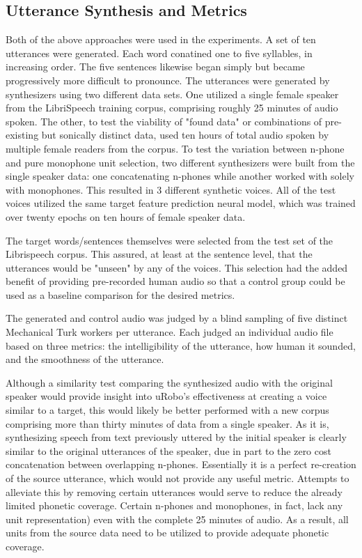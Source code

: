 \documentclass[10pt, journal, compsoc]{IEEEtran}
\begin{document}
\subsection{Utterance Synthesis and Metrics}
Both of the above approaches were used in the experiments. A set of ten utterances were generated. Each word conatined one to five syllables, in increasing order. The five sentences likewise began simply but became progressively more difficult to pronounce. The utterances were generated by synthesizers using two different data sets. One utilized a single female speaker from the LibriSpeech training corpus, comprising roughly 25 minutes of audio spoken. The other, to test the viability of "found data" or combinations of pre-existing but sonically distinct data, used ten hours of total audio spoken by multiple female readers from the corpus. To test the variation between n-phone and pure monophone unit selection, two different synthesizers were built from the single speaker data: one concatenating n-phones while another worked with solely with monophones. This resulted in 3 different synthetic voices. All of the test voices utilized the same target feature prediction neural  model, which was trained over twenty epochs on ten hours of female speaker data.\par 
The target words/sentences themselves were selected from the test set of the Librispeech corpus. This assured, at least at the sentence level, that the utterances would be "unseen" by any of the voices. This selection had the added benefit of providing pre-recorded human audio so that a control group could be used as a baseline comparison for the desired metrics. \par
The generated and control audio was judged by a blind sampling of five distinct Mechanical Turk workers per utterance. Each judged an individual audio file based on three metrics: the intelligibility of the utterance, how human it sounded, and the smoothness of the utterance.\par
Although a similarity test comparing the synthesized audio with the original speaker would provide insight into uRobo's effectiveness at creating a voice similar to a target, this would likely be better performed with a new corpus comprising more than thirty minutes of data from a single speaker. As it is, synthesizing speech from text previously uttered by the initial speaker is clearly similar to the original utterances of the speaker, due in part to the zero cost concatenation between overlapping n-phones. Essentially it is a perfect re-creation of the source utterance, which would not provide any useful metric. Attempts to alleviate this by removing certain utterances would serve to reduce the already limited phonetic coverage. Certain n-phones and monophones, in fact, lack any unit representation) even with the complete 25 minutes of audio. As a result, all units from the source data need to be utilized to provide adequate phonetic coverage.
\end{document}
